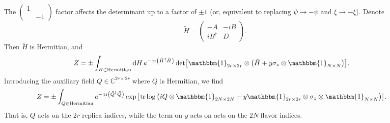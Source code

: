 \documentclass{article}
\begin{document}
The $\begin{pmatrix}
    1 & \\ & -1
\end{pmatrix}$ factor affects the determinant up to a factor of $\pm 1$ (or, equivalent to replacing $\overline{\psi} \rightarrow -\overline{\psi}$ and $\overline{\xi} \rightarrow -\overline{\xi}$).
Denote
\[ \tilde{H} = \begin{pmatrix}
    -A & -iB \\ iB^\dagger & D
\end{pmatrix}. \]
Then $\tilde{H}$ is Hermitian, and
\begin{align*}
    Z &= \pm \int_{H\in \text{Hermitian}} \dd{H} e^{-\tr({\tilde{H}^\dagger \tilde{H}})} \det[\mathbbm{1}_{2r\times 2r} \otimes \qty(\tilde{H} + y \sigma_z \otimes \mathbbm{1}_{N\times N})].
\end{align*}
Introducing the auxiliary field $Q\in \mathbb{C}^{2r\times 2r}$ where $Q$ is Hermitian, we find
\begin{align*}
    Z &= \pm \int_{Q\in \text{Hermitian}} e^{-\tr({\tilde{Q}^\dagger \tilde{Q}})} \exp\qty[\tr \log\qty(iQ\otimes \mathbbm{1}_{2N\times 2N} + y \mathbbm{1}_{2r\times 2r} \otimes \sigma_z \otimes \mathbbm{1}_{N\times N}) ].
\end{align*}
That is, $Q$ acts on the $2r$ replica indices, while the term on $y$ acts on acts on the $2N$ flavor indices.

% 
% 
\end{document}
